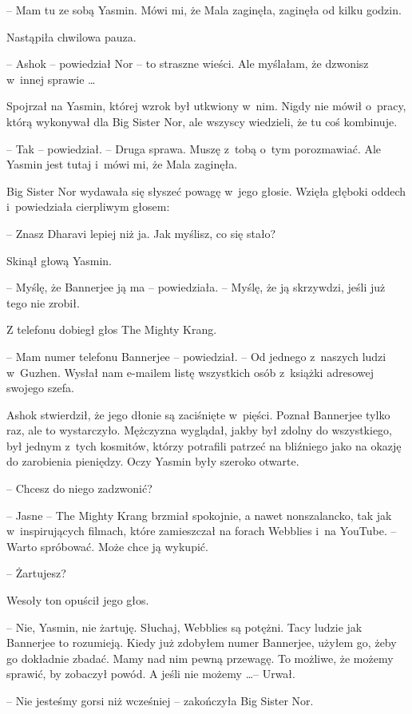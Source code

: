 \documentclass[oneside,polish,11pt,rmheadings]{mwbk}
\begin{document}
 -- Mam tu ze sobą Yasmin. Mówi mi, że Mala zaginęła, zaginęła od kilku godzin.

Nastąpiła chwilowa pauza. 

-- Ashok -- powiedział Nor -- to straszne wieści. Ale myślałam, że dzwonisz w~innej sprawie \ldots 

Spojrzał na Yasmin, której wzrok był utkwiony w~nim. Nigdy nie mówił o~pracy, którą wykonywał dla Big Sister Nor, ale wszyscy wiedzieli, że tu coś kombinuje.

-- Tak -- powiedział. -- Druga sprawa. Muszę z~tobą o~tym porozmawiać. Ale Yasmin jest tutaj i~mówi mi, że Mala zaginęła.

Big Sister Nor wydawała się słyszeć powagę w~jego głosie. Wzięła głęboki oddech i~powiedziała cierpliwym głosem: 

-- Znasz Dharavi lepiej niż ja. Jak myślisz, co się stało?

Skinął głową Yasmin. 

-- Myślę, że Bannerjee ją ma -- powiedziała. -- Myślę, że ją skrzywdzi, jeśli już tego nie zrobił.

Z telefonu dobiegł głos The Mighty Krang. 

-- Mam numer telefonu Bannerjee -- powiedział. -- Od jednego z~naszych ludzi w~Guzhen. Wysłał nam e-mailem listę wszystkich osób z~książki adresowej swojego szefa.

Ashok stwierdził, że jego dłonie są zaciśnięte w~pięści. Poznał Bannerjee tylko raz, ale to wystarczyło. Mężczyzna wyglądał, jakby był zdolny do wszystkiego, był jednym z~tych kosmitów, którzy potrafili patrzeć na bliźniego jako na okazję do zarobienia pieniędzy. Oczy Yasmin były szeroko otwarte.

-- Chcesz do niego zadzwonić?

-- Jasne -- The Mighty Krang brzmiał spokojnie, a nawet nonszalancko, tak jak w~inspirujących filmach, które zamieszczał na forach Webblies i~na YouTube. -- Warto spróbować. Może chce ją wykupić.

-- Żartujesz? 

Wesoły ton opuścił jego głos. 

-- Nie, Yasmin, nie żartuję. Słuchaj, Webblies są potężni. Tacy ludzie jak Bannerjee to rozumieją. Kiedy już zdobyłem numer Bannerjee, użyłem go, żeby go dokładnie zbadać. Mamy nad nim pewną przewagę. To możliwe, że możemy sprawić, by zobaczył powód. A jeśli nie możemy \ldots  -- Urwał.

-- Nie jesteśmy gorsi niż wcześniej -- zakończyła Big Sister Nor.
\end{document}

